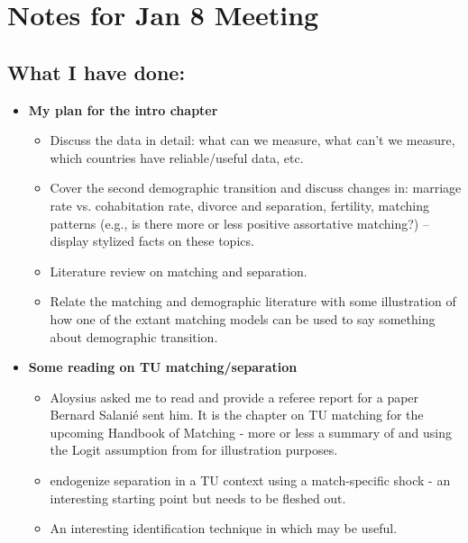 \documentclass{article}
\begin{document}

\section*{Notes for Jan 8 Meeting}
\subsection*{What I have done:}

\begin{itemize}
\item \textbf{My plan for the intro chapter}
\begin{itemize}
\item Discuss the data in detail: what can we measure, what can't we measure, which countries have reliable/useful data, etc.
\item Cover the second demographic transition and discuss changes in: marriage rate vs. cohabitation rate, divorce and separation, fertility, matching patterns (e.g., is there more or less positive assortative matching?) -- display stylized facts on these topics.
\item Literature review on matching and separation.
\item Relate the matching and demographic literature with some illustration of how one of the extant matching models can be used to say something about demographic transition.

\end{itemize}

\item \textbf{Some reading on TU matching/separation}
\begin{itemize}
\item Aloysius asked me to read and provide a referee report for a paper Bernard Salani\'{e} sent him. It is the chapter on TU matching for the upcoming Handbook of Matching - more or less a summary of \citet{galichon2022cupid} and \citet{galichon2022estimating} using the Logit assumption from \citet{choo2006marries} for illustration purposes.
\item \citet{adda2020there} endogenize separation in a TU context using a match-specific shock - an interesting starting point but needs to be fleshed out.
\item An interesting identification technique in \citet{gualdani2023partial} which may be useful.
\end{itemize}



\end{itemize}
\end{document}
